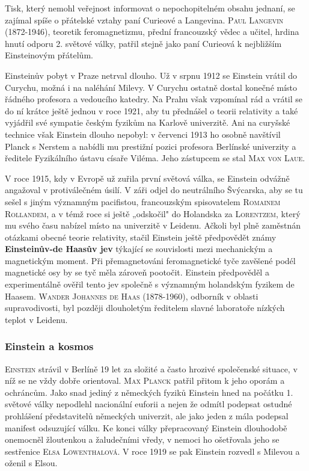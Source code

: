        Tisk, který nemohl veřejnost informovat o nepochopitelném obsahu jednaní, se zajímal spíše o
        přátelské vztahy paní Curieové a Langevina. \textsc{Paul Langevin} (1872-1946), teoretik
        feromagnetizmu, přední francouzský vědec a učitel, hrdina hnutí odporu 2. světové války,
        patřil stejně jako paní Curieová k nejbližším Einsteinovým přátelům.

        Einsteinův pobyt v Praze netrval dlouho. Už v srpnu 1912 se Einstein vrátil do Curychu,
        možná i na naléhání Milevy. V Curychu ostatně dostal konečné místo řádného profesora a
        vedoucího katedry. Na Prahu však vzpomínal rád a vrátil se do ní krátce ještě jednou v roce
        1921, aby tu přednášel o teorii relativity a také vyjádřil své sympatie českým fyzikům na
        Karlově univerzitě. Ani na curyšské technice však Einstein dlouho nepobyl: v červenci 1913
        ho osobně navštívil Planck s Nerstem a nabídli mu prestižní pozici profesora Berlínské
        univerzity a ředitele Fyzikálního ústavu císaře Viléma. Jeho zástupcem se stal \textsc{Max
        von Laue}.

        V roce 1915, kdy v Evropě už zuřila první světová válka, se Einstein odvážně angažoval v
        protiválečném úsilí. V záři odjel do neutrálního Švýcarska, aby se tu sešel s jiným
        významným pacifistou, francouzským spisovatelem \textsc{Romainem Rollandem}, a v témž roce
        si ještě „odskočil" do Holandska za \textsc{Lorentzem}, který mu svého času nabízel místo na
        univerzitě v Leidenu. Ačkoli byl plně zaměstnán otázkami obecné teorie relativity, stačil
        Einstein ještě předpovědět známy \textbf{Einsteinův-de Haasův jev} týkající se souvislosti
        mezi mechanickým a magnetickým moment. Při přemagnetováni feromagnetické tyče zavěšené podél
        magnetické osy by se tyč měla zároveň pootočit. Einstein předpověděl a experimentálně ověřil
        tento jev společně s významným holandským fyzikem de Haasem. \textsc{Wander Johannes de
        Haas} (1878-1960), odborník v oblasti supravodivosti, byl později dlouholetým ředitelem
        slavné laboratoře nízkých teplot v Leidenu.

      \subsubsection{Einstein a kosmos}\label{fyz:IchapIIsecIVssecIsssecVIII}
        \textsc{Einstein} strávil v Berlíně 19 let za složité a často hrozivé společenské situace, v
        níž se ne vždy dobře orientoval. \textsc{Max Planck} patřil přitom k jeho oporám a
        ochráncům. Jako snad jediný z německých fyziků Einstein hned na počátku 1. světové války
        nepodlehl nacionální euforii a nejen že odmítl podepsat ostudné prohlášení představitelů
        německých univerzit, ale jako jeden z mála podepsal manifest odsuzující válku. Ke konci
        války přepracovaný Einstein dlouhodobě onemocněl žloutenkou a žaludečními vředy, v nemoci ho
        ošetřovala jeho se sestřenice \textsc{Elsa Löwenthalová}. V roce 1919 se pak Einstein
        rozvedl s Milevou a oženil s Elsou.

